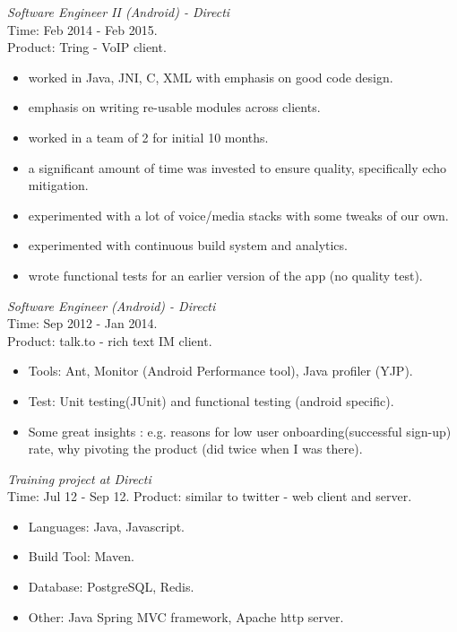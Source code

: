 \documentclass[margin,line]{resume}
\begin{document}
\begin{resume}
\textit{Software Engineer II (Android) - Directi} \\
Time: Feb 2014 - Feb 2015.\\
Product: Tring - VoIP client.\\
\begin{itemize}
	\item worked in Java, JNI, C, XML with emphasis on good code design.
	\item emphasis on writing re-usable modules across clients.
        \item worked in a team of 2 for initial 10 months.
	\item a significant amount of time was invested to ensure quality, specifically echo mitigation.
	\item experimented with a lot of voice/media stacks with some tweaks of our own.
	\item experimented with continuous build system and analytics.
	\item wrote functional tests for an earlier version of the app (no quality test). 
 \end{itemize}

\textit{Software Engineer (Android) - Directi} \\
Time: Sep 2012 - Jan 2014.\\
Product: talk.to - rich text IM client.\\
\begin{itemize}
\item Tools: Ant, Monitor (Android Performance tool), Java profiler (YJP).
\item Test: Unit testing(JUnit) and functional testing (android specific).
\item Some great insights : e.g. reasons for low user onboarding(successful sign-up) rate, why pivoting the product (did twice when I was there).
\end{itemize}

\textit{Training project at Directi}\\
Time: Jul 12 - Sep 12.
Product: similar to twitter - web client and server.\\
 \begin{itemize}
\item Languages: Java, Javascript.
\item Build Tool: Maven.
\item Database: PostgreSQL, Redis.
\item Other: Java Spring MVC framework, Apache http server.  
 \end{itemize}


\end{resume}
\end{document}
